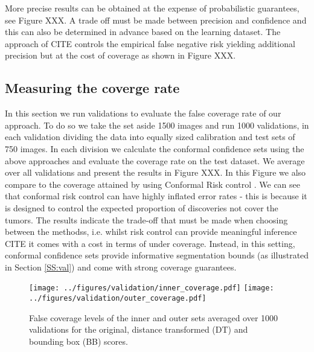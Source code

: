 More precise results can be obtained at the expense of probabilistic guarantees, see Figure XXX. A trade off must be made between precision and confidence and this can also be determined in advance based on the learning dataset. The approach of CITE controls the empirical false negative risk yielding additional precision but at the cost of coverage as shown in Figure XXX. 

\subsection{Measuring the coverge rate}
In this section we run validations to evaluate the false coverage rate of our approach. To do so we take the set aside 1500 images and run 1000 validations, in each validation dividing the data into equally sized calibration and test sets of 750 images. In each division we calculate the conformal confidence sets using the above approaches and evaluate the coverage rate on the test dataset. We average over all validations and present the results in Figure XXX. In this Figure we also compare to the coverage attained by using Conformal Risk control \cite{}. We can see that conformal risk control can have highly inflated error rates - this is because it is designed to control the expected proportion of discoveries not cover the tumors. The results indicate the trade-off that must be made when choosing between the methodss, i.e. whilst risk control can provide meaningful inference CITE it comes with a cost in terms of under coverage. Instead, in this setting, conformal confidence sets provide informative segmentation bounds (as illustrated in Section \ref{SS:val}) and come with strong coverage guarantees.
\begin{figure}
	\texttt{[image: ../figures/validation/inner\_coverage.pdf]}
	\texttt{[image: ../figures/validation/outer\_coverage.pdf]}
	\caption{False coverage levels of the inner and outer sets averaged over 1000 validations for the original, distance transformed (DT) and bounding box (BB) scores.}\label{fig:coverage}
\end{figure}

